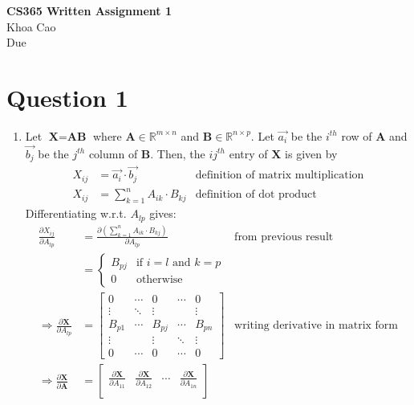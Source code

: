 \documentclass[11pt]{article}
\newcommand{\pd}[2]{\frac{\partial #1}{\partial #2}}
\begin{document}
\begin{center}
    \textbf{CS365 Written Assignment 1} \\
    Khoa Cao \\
    Due 
\end{center}

\section*{Question 1}
\begin{enumerate}
    \item Let $\textbf{X} = \textbf{AB}$ where $\textbf{A} \in \mathbb{R}^{m \times n}$ and $\textbf{B} \in \mathbb{R}^{n \times p}$. Let $\vec{a_i}$ be the $i^{th}$ row of $\textbf{A}$ and $\vec{b_j}$ be the $j^{th}$ column of $\textbf{B}$. Then, the $ij^{th}$ entry of $\textbf{X}$ is given by
    \begin{align*}
        X_{ij} &= \vec{a_i} \cdot \vec{b_j} & \text{definition of matrix multiplication} \\
        X_{ij} &= \sum_{k=1}^{n} A_{ik} \cdot B_{kj} & \text{definition of dot product}
    \end{align*}
    Differentiating w.r.t. $A_{lp}$ gives:
    \begin{align*}
        \pd{X_{ij}}{A_{lp}} &= \pd{(\sum_{k=1}^{n} A_{ik} \cdot B_{kj})}{A_{lp}} & \text{from previous result} \\
        &= \begin{cases}
            B_{pj} & \text{if } i = l \text{ and } k = p \\
            0 & \text{otherwise}
        \end{cases} \\
        \Rightarrow \pd{\textbf{X}}{A_{lp}} &= \begin{bmatrix}
            0 & \cdots & 0 & \cdots & 0 \\
            \vdots & \ddots & \vdots & & \vdots \\
            B_{p1} & \cdots & B_{pj} & \cdots & B_{pn} \\
            \vdots & & \vdots & \ddots & \vdots \\
            0 & \cdots & 0 & \cdots & 0
        \end{bmatrix} & \text{writing derivative in matrix form} \\
        \Rightarrow \pd{\textbf{X}}{\textbf{A}} &= \begin{bmatrix}
            \pd{\textbf{X}}{A_{11}} & \pd{\textbf{X}}{A_{12}} & \cdots & \pd{\textbf{X}}{A_{1n}} \\

\end{bmatrix}
\end{align*}
\end{enumerate}
\end{document}

